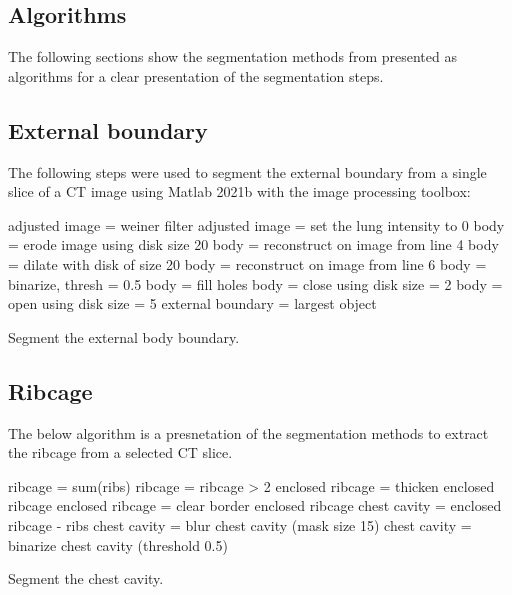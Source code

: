 \begin{appendices}
\chapter{Algorithms} \label{app:appendix-algos}
The following sections show the segmentation methods from 
presented as algorithms for a clear presentation of the segmentation steps. 

\section{External boundary}
The following steps were used to segment the external boundary 
from a single slice 
of a CT image using Matlab 2021b  
with the image processing toolbox:

\begin{algorithm}[H]
	\SetAlgoLined
		adjusted image = weiner filter\;
		adjusted image = set the lung intensity to 0\;
		body = erode image using disk size 20\;
		body = reconstruct on image from line 4\;
		body = dilate with disk of size 20\;
		body = reconstruct on image from line 6\;
		body = binarize, thresh = 0.5\;
		body = fill holes\;
		body = close using disk size = 2\;
		body = open using disk size = 5\;
		external boundary = largest object\;
	\caption{Segment the external body boundary.}
\end{algorithm}

\section{Ribcage}
The below algorithm is a presnetation of the segmentation methods to extract the 
ribcage from a selected CT slice.

\begin{algorithm}[H]
	\SetAlgoLined
		ribcage = sum(ribs)\;
		ribcage = ribcage > 2 \;
		enclosed ribcage = thicken enclosed ribcage \;
		enclosed ribcage = clear border enclosed ribcage \;
		chest cavity = enclosed ribcage - ribs \;
		chest cavity = blur chest cavity (mask size 15) \;
		chest cavity = binarize chest cavity (threshold 0.5) \;
	\caption{Segment the chest cavity.}
\end{algorithm}


\end{appendices}
